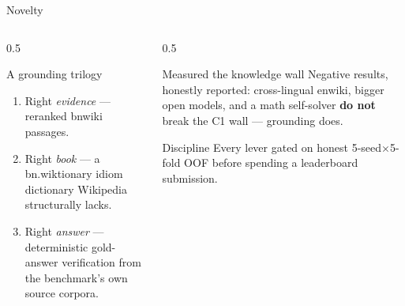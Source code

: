 \documentclass[aspectratio=169,11pt,t]{beamer}
\begin{document}
\begin{frame}{Novelty}
  \begin{columns}[T]
    \begin{column}{0.5\textwidth}
      \begin{block}{A grounding trilogy}
        \begin{enumerate}
          \item Right \emph{evidence} — reranked bnwiki passages.
          \item Right \emph{book} — a bn.wiktionary idiom dictionary Wikipedia structurally lacks.
          \item Right \emph{answer} — deterministic gold-answer verification from the benchmark's own source corpora.
        \end{enumerate}
      \end{block}
    \end{column}
    \begin{column}{0.5\textwidth}
      \begin{block}{Measured the knowledge wall}
        Negative results, honestly reported: cross-lingual enwiki, bigger open models, and a math self-solver \textbf{do not} break the C1 wall — grounding does.
      \end{block}
      \begin{block}{Discipline}
        Every lever gated on honest 5-seed$\times$5-fold OOF before spending a leaderboard submission.
      \end{block}
    \end{column}
  \end{columns}
\end{frame}
\end{document}
